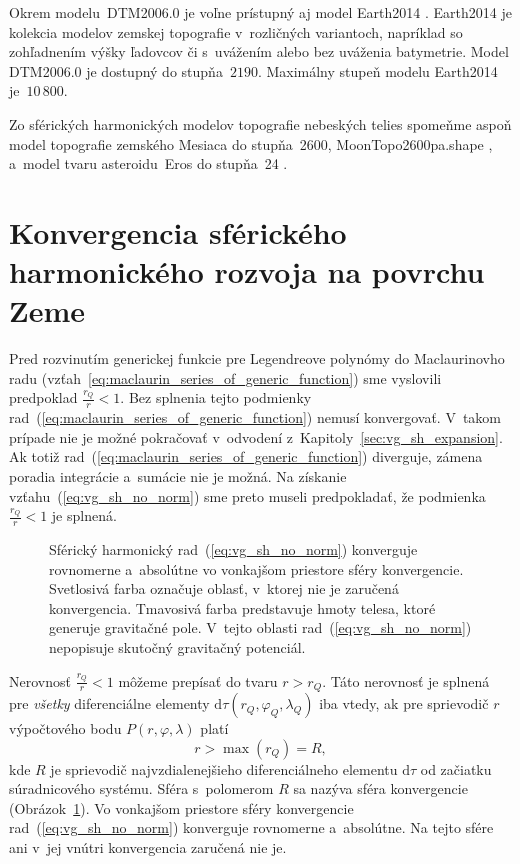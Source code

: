 \documentclass[a4paper,12pt]{book}
\newcommand{\diff}{\mathrm d}
\begin{document}
Okrem modelu~DTM2006.0 je voľne prístupný aj model Earth2014 
\parencite{Hirt2015}.  Earth2014 je kolekcia modelov zemskej topografie 
v~rozličných variantoch, napríklad so zohľadnením výšky ľadovcov či s~uvážením 
alebo bez uváženia batymetrie.  Model DTM2006.0 je dostupný do stupňa~$2190$.  
Maximálny stupeň modelu Earth2014 je~$10\, 800$.

Zo sférických harmonických modelov topografie nebeských telies spomeňme aspoň 
model topografie zemského Mesiaca do stupňa~2600, MoonTopo2600pa.shape 
\parencite{Wieczorek2015}, a~model tvaru asteroidu~Eros do stupňa~24 
\parencite{Zuber2000}.






\section{Konvergencia sférického harmonického rozvoja na povrchu Zeme}
\label{sec:convergence_of_spherical_harmonics}

Pred rozvinutím generickej funkcie pre Legendreove polynómy do Maclaurinovho 
radu (vzťah~\ref{eq:maclaurin_series_of_generic_function}) sme vyslovili 
predpoklad $\frac{r_Q}{r} < 1$.  Bez splnenia tejto podmienky 
rad~(\ref{eq:maclaurin_series_of_generic_function}) nemusí konvergovať.  
V~takom prípade nie je možné pokračovať v~odvodení 
z~Kapitoly~\ref{sec:vg_sh_expansion}.  Ak totiž 
rad~(\ref{eq:maclaurin_series_of_generic_function}) diverguje, zámena poradia 
integrácie a~sumácie nie je možná.  Na získanie vzťahu~(\ref{eq:vg_sh_no_norm}) 
sme preto museli predpokladať, že podmienka $\frac{r_Q}{r} < 1$ je splnená.

\begin{figure}
\centering

\caption{Sférický harmonický rad~(\ref{eq:vg_sh_no_norm}) konverguje rovnomerne 
a~absolútne vo vonkajšom priestore sféry konvergencie.  Svetlosivá farba 
označuje oblasť, v~ktorej nie je zaručená konvergencia.  Tmavosivá farba 
predstavuje hmoty telesa, ktoré generuje gravitačné pole.  V~tejto oblasti 
rad~(\ref{eq:vg_sh_no_norm}) nepopisuje skutočný gravitačný potenciál.}
\label{fig:spherical_harmonics_convergence}
\end{figure}

Nerovnosť $\frac{r_Q}{r} < 1$ môžeme prepísať do tvaru $r > r_Q$.  Táto
nerovnosť je splnená pre \emph{všetky} diferenciálne elementy $\diff \tau(r_Q,
\varphi_Q, \lambda_Q)$ iba vtedy, ak pre sprievodič $r$ výpočtového bodu $P(r,
\varphi, \lambda)$ platí
%
\begin{equation}
\label{eq:spherical_harmonic_convergence}
r > \max(r_Q) = R{,}
\end{equation}
%
kde $R$ je sprievodič najvzdialenejšieho diferenciálneho elementu $\diff\tau$ 
od začiatku súradnicového systému.  Sféra s~polomerom $R$ sa nazýva sféra 
konvergencie \parencite{Hotine} 
(Obrázok~\ref{fig:spherical_harmonics_convergence}).  Vo vonkajšom priestore 
sféry konvergencie rad~(\ref{eq:vg_sh_no_norm}) konverguje rovnomerne 
a~absolútne.  Na tejto sfére ani v~jej vnútri konvergencia zaručená nie je.
\end{document}
